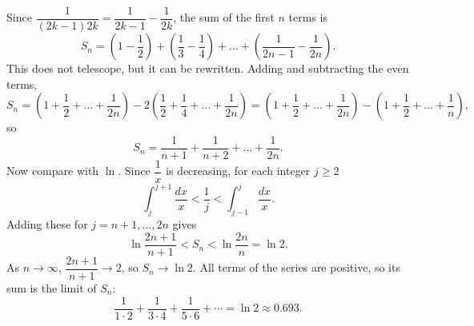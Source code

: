 Since $\dfrac{1}{(2k-1)2k}=\dfrac{1}{2k-1}-\dfrac{1}{2k}$, the sum of the first $n$ terms is
\[
S_n=\left(1-\dfrac{1}{2}\right)+\left(\dfrac{1}{3}-\dfrac{1}{4}\right)+\dots+\left(\dfrac{1}{2n-1}-\dfrac{1}{2n}\right).
\]
This does not telescope, but it can be rewritten. Adding and subtracting the even terms,
\[
S_n=\left(1+\dfrac{1}{2}+\dots+\dfrac{1}{2n}\right)-2\left(\dfrac{1}{2}+\dfrac{1}{4}+\dots+\dfrac{1}{2n}\right)=\left(1+\dfrac{1}{2}+\dots+\dfrac{1}{2n}\right)-\left(1+\dfrac{1}{2}+\dots+\dfrac{1}{n}\right),
\]
so
\[
S_n=\dfrac{1}{n+1}+\dfrac{1}{n+2}+\dots+\dfrac{1}{2n}.
\]
Now compare with $\ln$. Since $\dfrac{1}{x}$ is decreasing, for each integer $j\ge2$
\[
\int_j^{j+1}\dfrac{dx}{x}<\dfrac{1}{j}<\int_{j-1}^{j}\dfrac{dx}{x}.
\]
Adding these for $j=n+1,\dots,2n$ gives
\[
\ln\dfrac{2n+1}{n+1}<S_n<\ln\dfrac{2n}{n}=\ln2 .
\]
As $n\to\infty$, $\dfrac{2n+1}{n+1}\to2$, so $S_n\to\ln2$. All terms of the series are positive, so its sum is the limit of $S_n$:
\[
\dfrac{1}{1\cdot2}+\dfrac{1}{3\cdot4}+\dfrac{1}{5\cdot6}+\cdots=\boxed{\ln2}\approx0.693 .
\]
